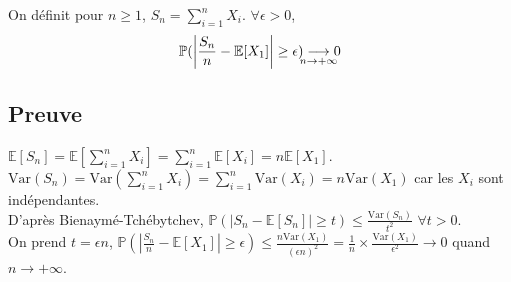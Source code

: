 \documentclass[a4paper,10pt]{book} %
\newcommand{\E}{\mathbb{E}} %
\renewcommand{\P}{\mathbb{P}} %
\newcommand\abs[1]{\left|#1\right|}
\newcommand{\lime}[4]{#1\underset{\mathclap{#2 \rightarrow #3}}{\longrightarrow} #4}
\newcommand{\Var}{\mathrm{Var}} %
\begin{document}
On définit pour $n\geq 1$, $\displaystyle S_n = \sum_{i= 1}^nX_i$. $\forall \epsilon>0$, $$\lime{\P(\abs{\frac{S_n}{n}-\E[X_1]}\geq \epsilon)}{n}{+\infty}{0}$$

\subsection*{Preuve}
$\displaystyle \E[S_n] = \E[\sum_{i=1}^n X_i] =\sum_{i= 1}^n\E[X_i] = n\E[X_1]$.\\

$\displaystyle \Var(S_n) = \Var(\sum_{i =1}^nX_i) = \sum_{i=1}^n\Var(X_i)=n\Var(X_1)$ car les $X_i$ sont indépendantes.\\

D'après Bienaymé-Tchébytchev, $\displaystyle \P(\abs{S_n-\E[S_n]}\geq t)\leq \frac{\Var(S_n)}{t^2}$ $\forall t>0$.\\

On prend $t =\epsilon n$, $\displaystyle \P(\abs{\frac{S_n}{n}-\E[X_1]}\geq \epsilon)\leq \frac{n\Var(X_1)}{(\epsilon n)^2}=\frac{1}{n}\times \frac{\Var(X_1)}{\epsilon^2} \rightarrow 0$ quand $n \rightarrow +\infty$.
\end{document}
